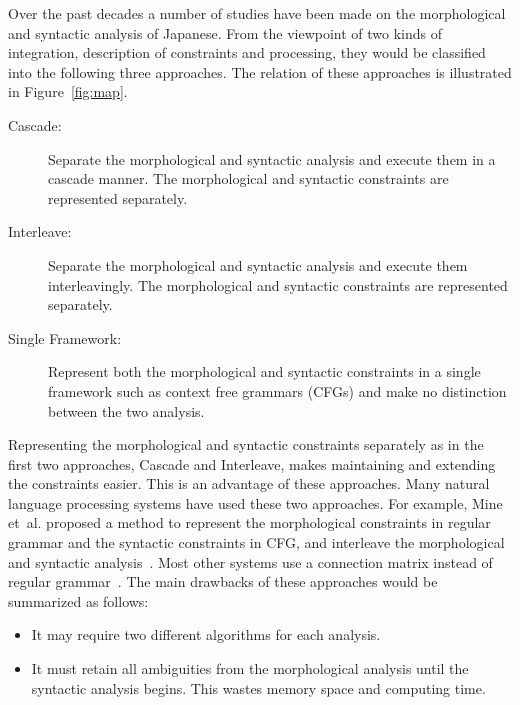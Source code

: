Over the past decades a number of studies have been made on the
morphological and syntactic analysis of Japanese. From the viewpoint
of two kinds of integration, description of constraints and
processing, they would be classified into the following three
approaches. The relation of these approaches is illustrated in
Figure~\ref{fig:map}.

\begin{center}
  
\end{center}

\begin{description}
\item[Cascade:]Separate the morphological and syntactic analysis and
  execute them in a cascade manner. The morphological and syntactic
  constraints are represented separately.

\item[Interleave:]Separate the morphological and syntactic analysis
  and execute them interleavingly. The morphological and syntactic
  constraints are represented separately.

\item[Single Framework:]Represent both the morphological and
  syntactic constraints in a single framework such as context free
  grammars (CFGs) and make no distinction between the two analysis.
\end{description}

Representing the morphological and syntactic constraints separately
as in the first two approaches, Cascade and Interleave, makes
maintaining and extending the constraints easier. This is an advantage
of these approaches. Many natural language processing systems have
used these two approaches. For example, Mine et~al. proposed a method
to represent the morphological constraints in regular grammar and the
syntactic constraints in CFG, and interleave the morphological and
syntactic analysis~\cite{mine:91:a}. Most other systems use a
connection matrix instead of regular
grammar~\cite{miyazaki:84:a,sugimura:88:b}. The main drawbacks of
these approaches would be summarized as follows:
\begin{itemize}
    \item It may require two different algorithms for each analysis.
    \item It must retain all ambiguities from the morphological analysis
    until the syntactic analysis begins. This wastes memory space and
    computing time.
\end{itemize}

